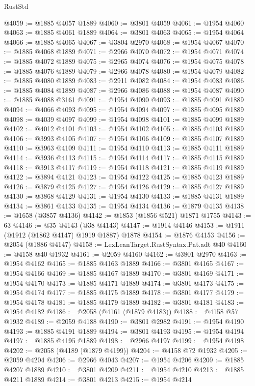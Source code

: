 \begin{lexlean}{RustStd}
\begin{coremodule}
{\begin{coremodule}
{{{{{{{{{{{{{{{{{{{{{{{{{{{{{@4059 := @1885 @4057 @1889
@4060 := @3801 @4059
@4061 := @1954 @4060
@4063 := @1885 @4061 @1889
@4064 := @3801 @4063
@4065 := @1954 @4064
@4066 := @1885 @4065
@4067 := @3804 @2970
@4068 := @1954 @4067
@4070 := @1885 @4068 @1889
@4071 := @2966 @4070
@4072 := @1954 @4071
@4074 := @1885 @4072 @1889
@4075 := @2965 @4074
@4076 := @1954 @4075
@4078 := @1885 @4076 @1889
@4079 := @2966 @4078
@4080 := @1954 @4079
@4082 := @1885 @4080 @1889
@4083 := @2911 @4082
@4084 := @1954 @4083
@4086 := @1885 @4084 @1889
@4087 := @2966 @4086
@4088 := @1954 @4087
@4090 := @1885 @4088 @3161
@4091 := @1954 @4090
@4093 := @1885 @4091 @1889
@4094 := @4066 @4093
@4095 := @1954 @4094
@4097 := @1885 @4095 @1889
@4098 := @4039 @4097
@4099 := @1954 @4098
@4101 := @1885 @4099 @1889
@4102 := @4012 @4101
@4103 := @1954 @4102
@4105 := @1885 @4103 @1889
@4106 := @3993 @4105
@4107 := @1954 @4106
@4109 := @1885 @4107 @1889
@4110 := @3963 @4109
@4111 := @1954 @4110
@4113 := @1885 @4111 @1889
@4114 := @3936 @4113
@4115 := @1954 @4114
@4117 := @1885 @4115 @1889
@4118 := @3913 @4117
@4119 := @1954 @4118
@4121 := @1885 @4119 @1889
@4122 := @3894 @4121
@4123 := @1954 @4122
@4125 := @1885 @4123 @1889
@4126 := @3879 @4125
@4127 := @1954 @4126
@4129 := @1885 @4127 @1889
@4130 := @3868 @4129
@4131 := @1954 @4130
@4133 := @1885 @4131 @1889
@4134 := @3861 @4133
@4135 := @1954 @4134
@4136 := @1879 @4135
@4138 := @1658 (@3857 @4136)
@4142 := @1853 (@1856 @521) @1871 @1755
@4143 := 63
@4146 := @35 @4143 (@38 @4143)
@4147 := @1914 @4146
@4153 := @1911 (@1912 (@1862 @4147) @1919 @1887) @1878
@4154 := @1876 @4153
@4156 := @2054 (@1886 @4147)
@4158 := LexLeanTarget.RustSyntax.Pat.adt @40
@4160 := @4158 @40 @1932
@4161 := @2059 @4160
@4162 := @3801 @2970
@4163 := @1954 @4162
@4165 := @1885 @4163 @1889
@4166 := @3801 @4165
@4167 := @1954 @4166
@4169 := @1885 @4167 @1889
@4170 := @3801 @4169
@4171 := @1954 @4170
@4173 := @1885 @4171 @1889
@4174 := @3801 @4173
@4175 := @1954 @4174
@4177 := @1885 @4175 @1889
@4178 := @3801 @4177
@4179 := @1954 @4178
@4181 := @1885 @4179 @1889
@4182 := @3801 @4181
@4183 := @1954 @4182
@4186 := @2058 (@4161 (@1879 @4183))
@4188 := @4158 @57 @1932
@4189 := @2059 @4188
@4190 := @3801 @2982
@4191 := @1954 @4190
@4193 := @1885 @4191 @1889
@4194 := @3801 @4193
@4195 := @1954 @4194
@4197 := @1885 @4195 @1889
@4198 := @2966 @4197
@4199 := @1954 @4198
@4202 := @2058 (@4189 (@1879 @4199))
@4204 := @4158 @72 @1932
@4205 := @2059 @4204
@4206 := @2966 @4043
@4207 := @1954 @4206
@4209 := @1885 @4207 @1889
@4210 := @3801 @4209
@4211 := @1954 @4210
@4213 := @1885 @4211 @1889
@4214 := @3801 @4213
@4215 := @1954 @4214
}}}}}}}}}}}}}}}}}}}}}}}}}}}}}
\end{coremodule}}
\end{coremodule}
\end{lexlean}
